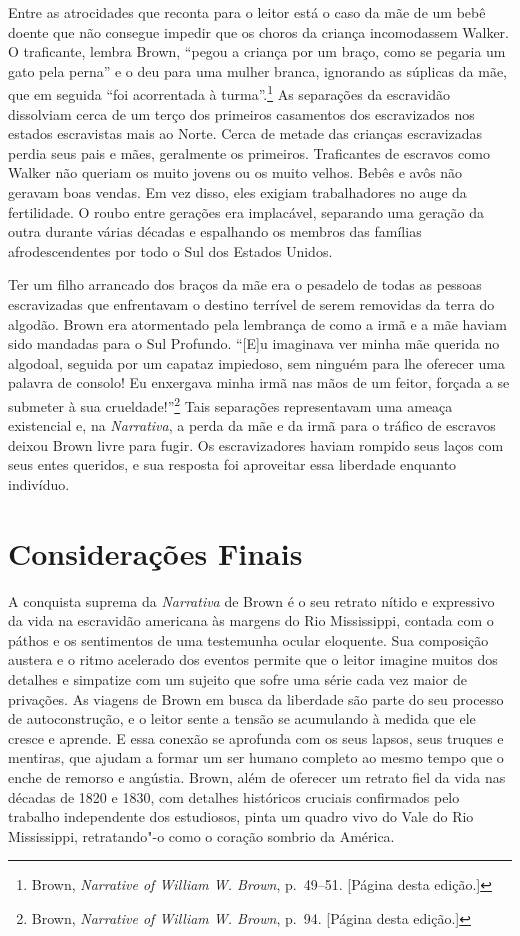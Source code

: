 Entre as atrocidades que reconta para o leitor está o caso da mãe de um
bebê doente que não consegue impedir que os choros da criança
incomodassem Walker. O traficante, lembra Brown, ``pegou a criança por
um braço, como se pegaria um gato pela perna'' e o deu para uma mulher
branca, ignorando as súplicas da mãe, que em seguida ``foi acorrentada à
turma''.\footnote{Brown, \emph{Narrative of William W. Brown}, p.~49--51.
  {[}Página \pageref{ref9} desta edição.{]}} As separações da escravidão dissolviam
cerca de um terço dos primeiros casamentos dos escravizados nos estados
escravistas mais ao Norte. Cerca de metade das crianças escravizadas
perdia seus pais e mães, geralmente os primeiros. Traficantes de
escravos como Walker não queriam os muito jovens ou os muito velhos.
Bebês e avôs não geravam boas vendas. Em vez disso, eles exigiam
trabalhadores no auge da fertilidade. O roubo entre gerações era
implacável, separando uma geração da outra durante várias décadas e
espalhando os membros das famílias afrodescendentes por todo o Sul dos
Estados Unidos.

Ter um filho arrancado dos braços da mãe era o pesadelo de todas as
pessoas escravizadas que enfrentavam o destino terrível de serem
removidas da terra do algodão. Brown era atormentado pela lembrança de
como a irmã e a mãe haviam sido mandadas para o Sul Profundo. ``{[}E{]}u
imaginava ver minha mãe querida no algodoal, seguida por um capataz
impiedoso, sem ninguém para lhe oferecer uma palavra de consolo! Eu
enxergava minha irmã nas mãos de um feitor, forçada a se submeter à sua
crueldade!''\footnote{Brown, \emph{Narrative of William W. Brown}, p.~94.
  {[}Página \pageref{ref10} desta edição.{]}} Tais separações representavam uma
ameaça existencial e, na \emph{Narrativa}, a perda da mãe e da irmã para
o tráfico de escravos deixou Brown livre para fugir. Os escravizadores
haviam rompido seus laços com seus entes queridos, e sua resposta foi
aproveitar essa liberdade enquanto indivíduo.

\section{Considerações Finais}

A conquista suprema da \emph{Narrativa} de Brown é o seu retrato nítido
e expressivo da vida na escravidão americana às margens do Rio
Mississippi, contada com o páthos e os sentimentos de uma testemunha
ocular eloquente. Sua composição austera e o ritmo acelerado dos eventos
permite que o leitor imagine muitos dos detalhes e simpatize com um
sujeito que sofre uma série cada vez maior de privações. As viagens de
Brown em busca da liberdade são parte do seu processo de autoconstrução,
e o leitor sente a tensão se acumulando à medida que ele cresce e
aprende. E essa conexão se aprofunda com os seus lapsos, seus truques e
mentiras, que ajudam a formar um ser humano completo ao mesmo tempo que
o enche de remorso e angústia. Brown, além de oferecer um retrato fiel
da vida nas décadas de 1820 e 1830, com detalhes históricos cruciais
confirmados pelo trabalho independente dos estudiosos, pinta um quadro
vivo do Vale do Rio Mississippi, retratando"-o como o coração sombrio da
América.
